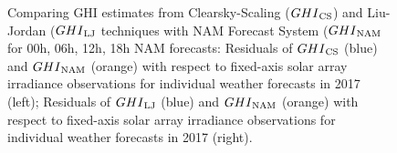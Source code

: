 \begin{figure}
\begin{center}
    \hspace{5mm}
    \caption[Comparing GHI estimates from Clearsky-Scaling ($GHI\textsubscript{CS}$) and Liu-Jordan ($GHI\textsubscript{LJ}$ techniques with NAM Forecast System ($GHI\textsubscript{NAM}$ for 00h, 06h, 12h, 18h NAM forecasts]{Comparing GHI estimates from Clearsky-Scaling ($GHI\textsubscript{CS}$) and Liu-Jordan ($GHI\textsubscript{LJ}$ techniques with NAM Forecast System ($GHI\textsubscript{NAM}$ for 00h, 06h, 12h, 18h NAM forecasts: Residuals of $GHI\textsubscript{CS}$ (blue) and $GHI\textsubscript{NAM}$ (orange) with respect to fixed-axis solar array irradiance observations for individual weather forecasts in 2017 (left); Residuals of $GHI\textsubscript{LJ}$ (blue) and $GHI\textsubscript{NAM}$ (orange) with respect to fixed-axis solar array irradiance observations for individual weather forecasts in 2017 (right).}
    \label{fig:fig_ghi_comparison}
\end{center}
\end{figure}

